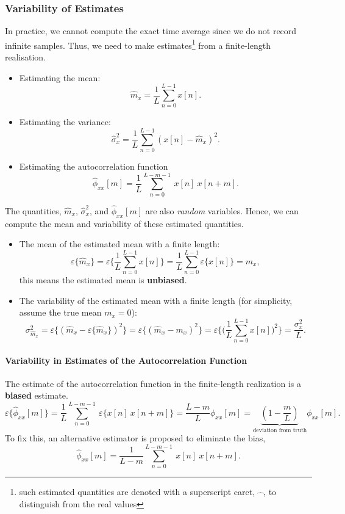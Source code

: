 \subsubsection{Variability of Estimates}
In practice, we cannot compute the exact time average since we do not record infinite samples. Thus, we need to make estimates\footnote{such estimated quantities are denoted with a superscript caret, $\widehat{\text{ }}$, to distinguish from the real values} from a finite-length realisation.
\begin{itemize}
    \item Estimating the mean:
    \[
        \widehat{m}_{x} = \frac{1}{L} \sum_{n=0}^{L-1} x[n].
    \]

    \item Estimating the variance:
    \[
        \widehat{\sigma}_x^2 = \frac{1}{L} \sum_{n=0}^{L-1} (x[n] - \widehat{m}_{x})^2.
    \]

    \item Estimating the autocorrelation function
    \[
        \widehat{\phi}_{xx}[m] = \frac{1}{L}\sum_{n=0}^{L-m-1} \ x[n] \ x[n+m].
    \]
\end{itemize}
The quantities, $\widehat{m}_{x}$, $\widehat{\sigma}_x^2$, and $\widehat{\phi}_{xx}[m]$ are also \textit{random} variables. Hence, we can compute the mean and variability of these estimated quantities. 

\begin{itemize}
    \item The mean of the estimated mean with a finite length:
    \[
        \varepsilon\{\widehat{m}_{x}\} = \varepsilon\bigg\{\frac{1}{L} \sum_{n=0}^{L-1} x[n] \bigg\} = \frac{1}{L} \sum_{n=0}^{L-1} \varepsilon\{x[n]\} = m_x,
    \]
    this means the estimated mean is \textbf{unbiased}.

    \item The variability of the estimated mean with a finite length (for simplicity, assume the true mean $m_x = 0$):
    \[
        \sigma_{\widehat{m}_{x}}^2 = \varepsilon\{(\widehat{m}_{x} - \varepsilon\{\widehat{m}_{x}\})^2\} =  \varepsilon\{(\widehat{m}_{x} - m_x)^2\} = \varepsilon \bigg\{\bigg(\frac{1}{L} \sum_{n=0}^{L-1} x[n]\bigg)^2\bigg\} = \frac{\sigma_x^2}{L}.
    \]
\end{itemize}

\paragraph{Variability in Estimates of the Autocorrelation Function} The estimate of the autocorrelation function in the finite-length realization is a \textbf{biased} estimate.
\[
    \varepsilon\{\widehat{\phi}_{xx}[m]\} = \frac{1}{L}\sum_{n=0}^{L-m-1} \ \varepsilon\{x[n] \ x[n+m] \} = \frac{L-m}{L} \phi_{xx}[m] = \underbrace{(1-\frac{m}{L})}_{\text{deviation from truth}}\phi_{xx}[m].
\]
To fix this, an alternative estimator is proposed to eliminate the bias,
\[
    \widehat{\phi}_{xx}[m] = \frac{1}{L-m}\sum_{n=0}^{L-m-1} \ x[n] \ x[n+m].
\]

